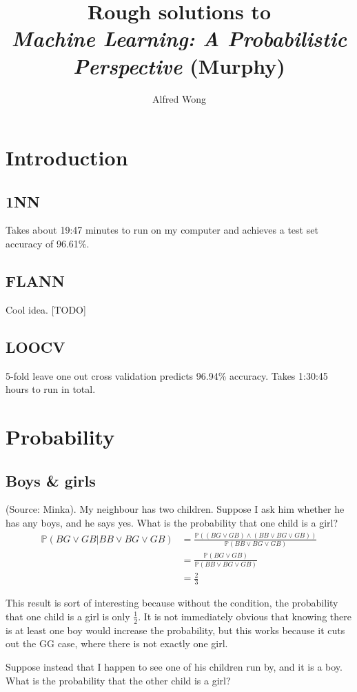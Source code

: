 \documentclass{article}
\title{Rough solutions to\\\textit{Machine Learning: A Probabilistic Perspective} (Murphy)}
\author{Alfred Wong}
\date{\vspace{-\baselineskip}}
\begin{document}
\maketitle
\pagebreak

\section{Introduction}
\subsection{1NN}
Takes about 19:47 minutes to run on my computer and achieves a test set accuracy of 96.61\%.
\subsection{FLANN}
Cool idea. [TODO]
\subsection{LOOCV}
5-fold leave one out cross validation predicts 96.94\% accuracy. Takes 1:30:45 hours to run in total.
\pagebreak

\section{Probability}
\subsection{Boys \& girls}
(Source: Minka). My neighbour has two children. Suppose I ask him whether he has any boys, and he says yes. What is the probability that one child is a girl?
\begin{align*}
\mathbb{P}(BG \lor GB | BB \lor BG \lor GB) &= \frac{\mathbb{P}((BG \lor GB) \land (BB \lor BG \lor GB))}{\mathbb{P}(BB \lor BG \lor GB)}\\
&= \frac{\mathbb{P}(BG \lor GB)}{\mathbb{P}(BB \lor BG \lor GB)}\\
&= \frac{2}{3}
\end{align*}

This result is sort of interesting because without the condition, the probability that one child is a girl is only $\frac{1}{2}$. It is not immediately obvious that knowing there is at least one boy would increase the probability, but this works because it cuts out the GG case, where there is not exactly one girl.

Suppose instead that I happen to see one of his children run by, and it is a boy. What is the probability that the other child is a girl?
\end{document}
